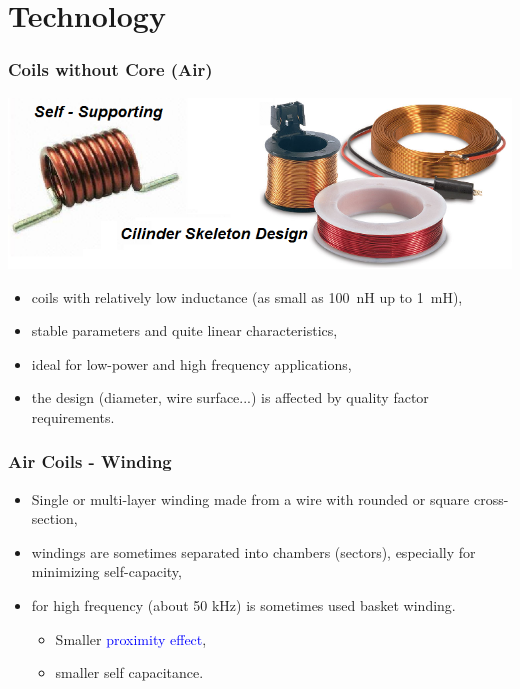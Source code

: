 \documentclass{beamer}
\begin{document}
\section{\texorpdfstring{Technology}{Technology}}
	\begin{frame}
	\frametitle{Coils without Core (Air)}
	\begin{center}
		\includegraphics[scale=0.45]{obr04_vzdCivky.png}
	\end{center}
	\small
	\begin{itemize}
		\item coils with relatively low inductance (as small as 100~nH up to 1~mH), 
		\item stable parameters and quite linear characteristics,
		\item ideal for low-power and high frequency applications, 
		\item the design (diameter, wire surface...) is affected by quality factor requirements.
	\end{itemize}
  \end{frame}
	\begin{frame}
	\frametitle{Air Coils - Winding}
	\begin{itemize}
		\item Single or multi-layer winding made from a wire with rounded or square cross-section, 
		\item windings are sometimes separated into chambers (sectors), especially for minimizing self-capacity,
		\item for high frequency (about 50 kHz) is sometimes used basket winding.
		\begin{itemize}
			\item Smaller \textcolor{blue}{proximity effect},
			\item smaller self capacitance.
		\end{itemize}
	\end{itemize}
  \end{frame}
\end{document}
